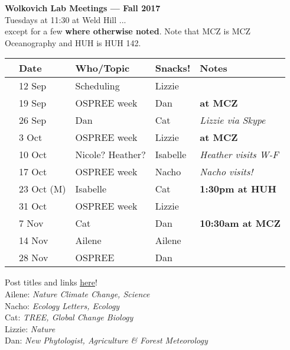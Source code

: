 \documentclass[11pt]{article}
\begin{document}
 
\raggedright
{}

\begin{center} 
{\large \textbf{Wolkovich Lab Meetings --- Fall 2017}} \\ [2pt]
Tuesdays at 11:30 at Weld Hill ...\\  except for a few {\bf where otherwise noted}. Note that MCZ is MCZ Oceanography and HUH is HUH 142.\\
\end{center} 

\begin{center}
\begin{tabular}{ p{0.2 cm}  p{2 cm}  p{5 cm}  p{2 cm}  p{4 cm} }  \hline \hline
 & \textbf{Date}
   & \textbf{Who/Topic}
      & \textbf{Snacks!} 
         & \textbf{Notes} \\ 
\hline \hline
 & 12 Sep & Scheduling & Lizzie &  \\\hline
 & 19 Sep & OSPREE week & Dan &    {\bf at MCZ}\\\hline
 & 26 Sep & Dan & Cat     & \emph{Lizzie via Skype} \\\hline
 & 3 Oct & OSPREE week  &  Lizzie  & {\bf at MCZ}\\\hline 
& 10 Oct & Nicole? Heather? & Isabelle  & \emph{Heather visits W-F}\\\hline
 & 17 Oct & OSPREE week  & Nacho & \emph{Nacho visits!}\\\hline
 & 23 Oct (M) & Isabelle & Cat & {\bf 1:30pm at HUH} \\\hline
 & 31 Oct & OSPREE week  & Lizzie &  \\\hline
 & 7 Nov & Cat & Dan  & {\bf 10:30am at MCZ} \\\hline 
 & 14 Nov & Ailene  &  Ailene & \\\hline  
 & 28 Nov & OSPREE &  Dan & \\\hline  

\hline
\end{tabular}
\end{center}
\vspace{6pt}
 Post titles and links \href{https://docs.google.com/document/d/1j0WdDbjdp8ERLSO7whvtnP-tOblYMlX33TSCXy_uRKo/edit?usp=sharing}{\underline{here}}!\\
Ailene: \emph{Nature Climate Change, Science}\\
Nacho: \emph{Ecology Letters, Ecology}\\
Cat: \emph{TREE, Global Change Biology}\\
Lizzie: \emph{Nature}\\
Dan: \emph{New Phytologist, Agriculture \& Forest Meteorology}\\
\end{document}
